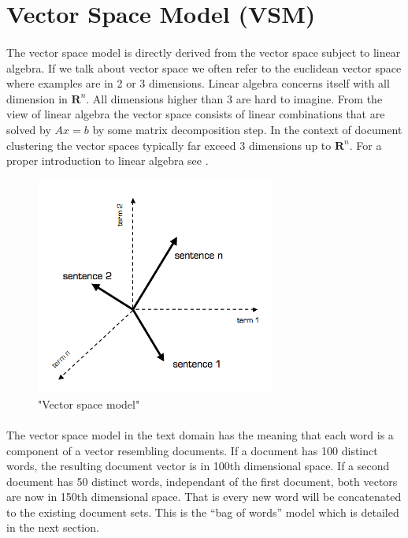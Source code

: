 \newpage{}
\section{Vector Space Model (VSM)}
  
  \paragraph{}
    The vector space model is directly derived from the vector space subject to linear algebra. If we talk about vector space we often refer to the euclidean vector space where examples are in 2 or 3 dimensions. Linear algebra concerns itself with all dimension in $\mathbf{R}^{n}$. All dimensions higher than 3 are hard to imagine. From the view of linear algebra the vector space consists of linear combinations that are solved by $Ax = b$ by some matrix decomposition step. In the context of document clustering the vector spaces typically far exceed 3 dimensions up to $\mathbf{R}^{n}$. For a proper introduction to linear algebra see \cite{Strang2009}.

  \begin{figure}[h!]
    \centering
      \includegraphics[width=0.7\textwidth]{vsm.png}
      \caption{"Vector space model"}
      \label{vsm_pic}
  \end{figure}

  \paragraph{}
    The vector space model in the text domain has the meaning that each word is a component of a vector resembling documents. If a document has 100 distinct words, the resulting document vector is in 100th dimensional space. If a second document has 50 distinct words, independant of the first document, both vectors are now in 150th dimensional space. That is every new word will be concatenated to the existing document sets. This is the ``bag of words'' model which is detailed in the next section.

